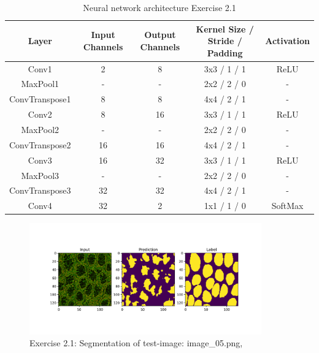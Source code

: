 \documentclass[a4paper,10pt]{article}
\begin{document}
\begin{table}[h]
\centering
\begin{tabular}{|c|c|c|c|c|}
\hline
\textbf{Layer} & \textbf{Input Channels} & \textbf{Output Channels} & \textbf{Kernel Size / Stride / Padding} & \textbf{Activation} \\ \hline
Conv1          & 2                       & 8                        & 3x3 / 1 / 1                             & ReLU                \\ \hline
MaxPool1       & -                       & -                        & 2x2 / 2 / 0                             & -                   \\ \hline
ConvTranspose1 & 8                       & 8                        & 4x4 / 2 / 1                             & -                   \\ \hline
Conv2          & 8                      & 16                        & 3x3 / 1 / 1                             & ReLU                \\ \hline
MaxPool2       & -                       & -                        & 2x2 / 2 / 0                             & -                   \\ \hline
ConvTranspose2 & 16                      & 16                       & 4x4 / 2 / 1                             & -                   \\ \hline
Conv3          & 16                      & 32                       & 3x3 / 1 / 1                             & ReLU                \\ \hline
MaxPool3       & -                       & -                        & 2x2 / 2 / 0                             & -                   \\ \hline
ConvTranspose3 & 32                      & 32                       & 4x4 / 2 / 1                             & -                   \\ \hline
Conv4          & 32                       & 2                       & 1x1 / 1 / 0                             & SoftMax                   \\ \hline
\end{tabular}
\caption{Neural network architecture Exercise 2.1}
\label{table:architecture_no_bn_v2}
\end{table}


\begin{figure}[ht!]
\centering
\includegraphics[width=100mm]{figures/assignment_3/segmentation_test4.png}
\caption{Exercise 2.1: Segmentation of test-image: image\_05.png, }
\label{fig:segexample}
\end{figure}
\end{document}
